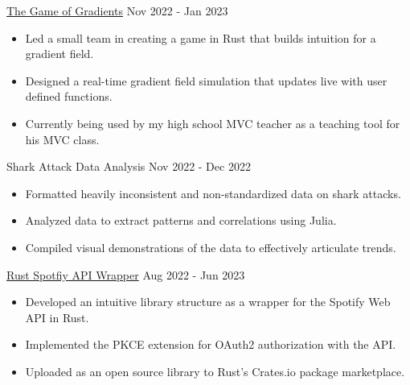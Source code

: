 \documentclass[9pt]{resume}
\begin{document}
    \vspace{-0.2cm}
    \begin{experiencelist}
        \experiencenocompany
            {\href{https://github.com/TheSharkhead2/The_Game_of_Gradients}{The Game of Gradients}}
            {Nov 2022 - Jan 2023}
            {\begin{itemize}[noitemsep, topsep=1pt] 
                \item Led a small team in creating a game in Rust that builds intuition for a gradient field.
                \item Designed a real-time gradient field simulation that updates live with user defined functions. 
                \item Currently being used by my high school MVC teacher as a teaching tool for his MVC class. 
            \end{itemize}}
        \experiencenocompany 
            {Shark Attack Data Analysis}
            {Nov 2022 - Dec 2022}
            {\begin{itemize}[noitemsep, topsep=1pt]
                \item Formatted heavily inconsistent and non-standardized data on shark attacks.
                \item Analyzed data to extract patterns and correlations using Julia. 
                \item Compiled visual demonstrations of the data to effectively articulate trends. 
            \end{itemize}}
        \experiencenocompany
            {\href{https://github.com/TheSharkhead2/spotify.rs}{Rust Spotfiy API Wrapper}}
            {Aug 2022 - Jun 2023}
            {\begin{itemize}[noitemsep, topsep=1pt]
                \item Developed an intuitive library structure as a wrapper for the Spotify Web API in Rust. 
                \item Implemented the PKCE extension for OAuth2 authorization with the API. 
                \item Uploaded as an open source library to Rust's Crates.io package marketplace.
            \end{itemize}}

\end{experiencelist}
\end{document}
